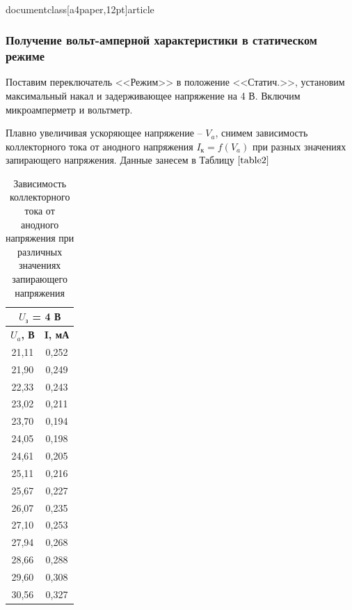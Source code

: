 \\documentclass[a4paper,12pt]{article}
\begin{document}
\subsubsection*{Получение вольт-амперной характеристики в статическом режиме}

Поставим переключатель <<Режим>> в положение <<Статич.>>, установим максимальный накал и задерживающее напряжение на 4 В. Включим микроамперметр и вольтметр.

Плавно увеличивая ускоряющее напряжение -- $V_a$, снимем зависимость коллекторного тока от анодного напряжения $I_к = f(V_a)$ при разных значениях запирающего напряжения. Данные занесем в Таблицу $\ref{table2}$

\newpage

\begin{table}[h]
\centering
\caption{Зависимость коллекторного тока от анодного напряжения при различных  \\ значениях запирающего напряжения}
\label{table2}
\begin{minipage}{0.3\textwidth}
	\begin{tabular}{|cc|}
	\hline
	\multicolumn{2}{|c|}{\textbf{$U_з$   = 4 В}} \\ \hline
	\multicolumn{1}{|c|}{\textbf{$U_a$, В}} & \textbf{I, мА} \\ \hline
	\multicolumn{1}{|c|}{21,11} & 0,252 \\ \hline
	\multicolumn{1}{|c|}{21,90} & 0,249 \\ \hline
	\multicolumn{1}{|c|}{22,33} & 0,243 \\ \hline
	\multicolumn{1}{|c|}{23,02} & 0,211 \\ \hline
	\multicolumn{1}{|c|}{23,70} & 0,194 \\ \hline
	\multicolumn{1}{|c|}{24,05} & 0,198 \\ \hline
	\multicolumn{1}{|c|}{24,61} & 0,205 \\ \hline
	\multicolumn{1}{|c|}{25,11} & 0,216 \\ \hline
	\multicolumn{1}{|c|}{25,67} & 0,227 \\ \hline
	\multicolumn{1}{|c|}{26,07} & 0,235 \\ \hline
	\multicolumn{1}{|c|}{27,10} & 0,253 \\ \hline
	\multicolumn{1}{|c|}{27,94} & 0,268 \\ \hline
	\multicolumn{1}{|c|}{28,66} & 0,288 \\ \hline
	\multicolumn{1}{|c|}{29,60} & 0,308 \\ \hline
	\multicolumn{1}{|c|}{30,56} & 0,327 \\ \hline

\end{tabular}
\end{minipage}
\end{table}
\end{document}
